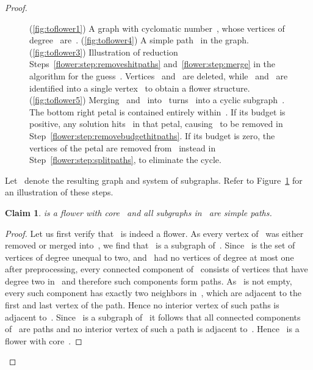 \let\accentvec\vec  \documentclass{llncs}
\newtheorem{numberedclaim}{Claim}
\begin{document}
\begin{proof}
\begin{figure}[t]
\begin{center}
\caption{(\ref{fig:toflower1}) A graph with cyclomatic number~, whose vertices of degree~ are~. (\ref{fig:toflower4}) A simple path~ in the graph. (\ref{fig:toflower3}) Illustration of reduction Steps~\ref{flower:step:removeshitpaths} and~\ref{flower:step:merge} in the algorithm for the guess~. Vertices~ and~ are deleted, while~ and~ are identified into a single vertex~ to obtain a flower structure. (\ref{fig:toflower5}) Merging~ and~ into~ turns~ into a cyclic subgraph~. The bottom right petal is contained entirely within~. If its budget is positive, any solution hits~ in that petal, causing~ to be removed in Step~\ref{flower:step:removebudgethitpaths}. If its budget is zero, the vertices of the petal are removed from~ instead in Step~\ref{flower:step:splitpaths}, to eliminate the cycle.}\label{fig:mergeintoflower}
\end{center}
\end{figure}

Let~ denote the resulting graph and system of subgraphs. Refer to Figure~\ref{fig:mergeintoflower} for an illustration of these steps.

\begin{numberedclaim}
 is a flower with core~ and all subgraphs in~ are simple paths.
\end{numberedclaim}
\begin{proof}
Let us first verify that~ is indeed a flower. As every vertex of~ was either removed or merged into~, we find that~ is a subgraph of~. Since~ is the set of vertices of degree unequal to two, and~ had no vertices of degree at most one after preprocessing, every connected component of~ consists of vertices that have degree two in~ and therefore such components form paths. As~ is not empty, every such component has exactly two neighbors in~, which are adjacent to the first and last vertex of the path. Hence no interior vertex of such paths is adjacent to~. Since~ is a subgraph of~ it follows that all connected components of~ are paths and no interior vertex of such a path is adjacent to~. Hence~ is a flower with core~.


\end{proof}
\end{proof}
\end{document}
